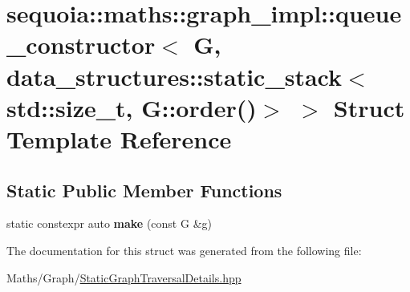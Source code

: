 \hypertarget{structsequoia_1_1maths_1_1graph__impl_1_1queue__constructor_3_01_g_00_01data__structures_1_1statf7aef65b4017b7769cfe8cf0740be811}{}\section{sequoia\+::maths\+::graph\+\_\+impl\+::queue\+\_\+constructor$<$ G, data\+\_\+structures\+::static\+\_\+stack$<$ std\+::size\+\_\+t, G\+::order()$>$ $>$ Struct Template Reference}
\label{structsequoia_1_1maths_1_1graph__impl_1_1queue__constructor_3_01_g_00_01data__structures_1_1statf7aef65b4017b7769cfe8cf0740be811}
\subsection*{Static Public Member Functions}
\begin{DoxyCompactItemize}
\item 
\mbox{\label{structsequoia_1_1maths_1_1graph__impl_1_1queue__constructor_3_01_g_00_01data__structures_1_1statf7aef65b4017b7769cfe8cf0740be811_a5a1d3e0b94f14ac97ba30710eb7421bf}} 
static constexpr auto {\bfseries make} (const G \&g)
\end{DoxyCompactItemize}


The documentation for this struct was generated from the following file\+:\begin{DoxyCompactItemize}
\item 
Maths/\+Graph/\mbox{\hyperlink{_static_graph_traversal_details_8hpp}{Static\+Graph\+Traversal\+Details.\+hpp}}\end{DoxyCompactItemize}
